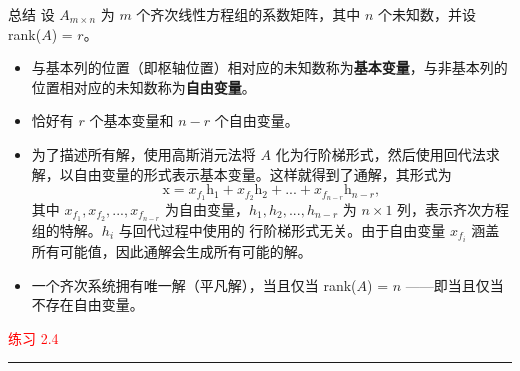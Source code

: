 \begin{bluebox}{总结}
设 \(A_{m \times n}\) 为 \(m\) 个齐次线性方程组的系数矩阵，其中 \(n\) 个未知数，并设 rank(\(A\)) = \(r\)。
\begin{itemize}
    \item 与基本列的位置（即枢轴位置）相对应的未知数称为\textbf{基本变量}，与非基本列的位置相对应的未知数称为\textbf{自由变量}。
    \item 恰好有 \(r\) 个基本变量和 \(n-r\) 个自由变量。
    \item 为了描述所有解，使用高斯消元法将 \(A\) 化为行阶梯形式，然后使用回代法求解，以自由变量的形式表示基本变量。这样就得到了通解，其形式为
    \[
    \mathrm{x} = x_{f_1}\mathrm{h}_1 + x_{f_2}\mathrm{h}_2 + ... + x_{f_{n-r}}\mathrm{h}_{n-r},
    \]
    其中 \(x_{f_1}, x_{f_2}, ..., x_{f_{n-r}}\) 为自由变量，\(h_1, h_2, ..., h_{n-r}\) 为 \(n \times 1\) 列，表示齐次方程组的特解。\(h_i\) 与回代过程中使用的
    行阶梯形式无关。由于自由变量 \(x_{f_i}\) 涵盖所有可能值，因此通解会生成所有可能的解。
    \item 一个齐次系统拥有唯一解（平凡解），当且仅当 rank(\(A\)) = \(n\) ——即当且仅当不存在自由变量。
\end{itemize}
\end{bluebox}


\textcolor{red}{练习 2.4}
\color{red}\rule{\textwidth}{0.4pt}\color{black}

